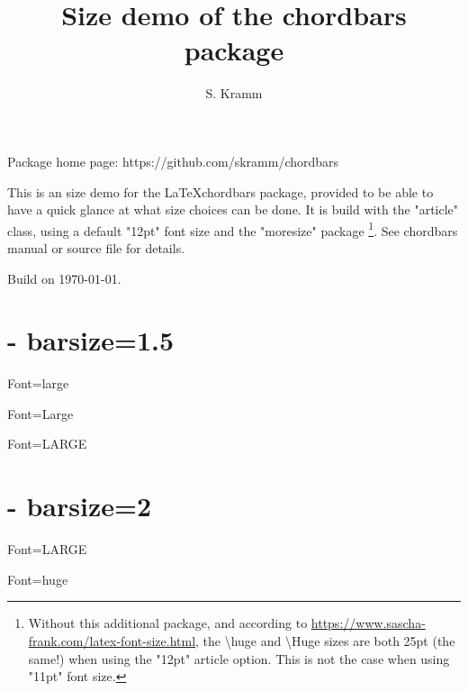 \documentclass[12pt]{article}
\title{Size demo of the chordbars package}
\author{S. Kramm}
\begin{document}
\countbarsNo

\songtitle

Package home page: https://github.com/skramm/chordbars

This is an size demo for the \LaTeX chordbars package, provided to be able to have a quick glance at what size choices can be done.
It is build with the "article" class,
using a default "12pt" font size and the "moresize" package
\footnote{Without this additional package, and according to \url{https://www.sascha-frank.com/latex-font-size.html},
the \textbackslash huge and \textbackslash Huge sizes are both 25pt (the same!) when using the "12pt" article option.
This is not the case when using "11pt" font size.}.
See chordbars manual or source file for details.

Build on \today.

\section{- barsize=1.5}
\def\barsize{1.5}%

\def\chordFontSize{\large\bfseries}
\begin{chordbar}{4}{Font=large}
\end{chordbar}


\def\chordFontSize{\Large\bfseries}
\begin{chordbar}{4}{Font=Large}
\end{chordbar}

\def\chordFontSize{\LARGE\bfseries}
\begin{chordbar}{4}{Font=LARGE}
\end{chordbar}

\section{- barsize=2}
\def\barsize{2}%

\def\chordFontSize{\LARGE\bfseries}
\begin{chordbar}{4}{Font=LARGE}
\end{chordbar}

\def\chordFontSize{\huge\bfseries}
\begin{chordbar}{4}{Font=huge}
\end{chordbar}
\end{document}
